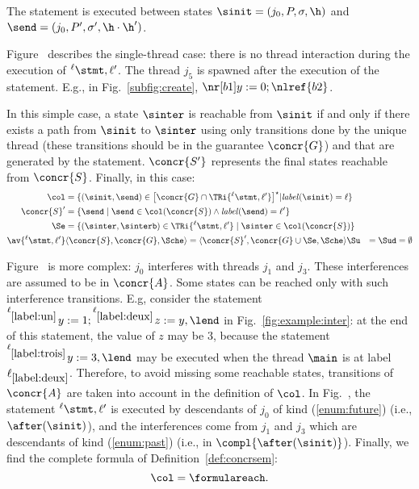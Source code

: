 \documentclass[12pt]{article}
\let\vide\emptyset \let\appartient\in
\let\firstunion\cup
\let\firstinter\cap
\let\emptyset\vide \let\in\appartient
\let\cup\firstunion
\let\cap\firstinter
\newcommand{\lab}{  {}^{\ell}}
\newcommand{\li}[1]{ {}^{\ell_{#1}}  }
\newcommand{\lbl}{\mathit{label}}
\begin{document}
The statement is executed between states \(\sinit=(j_0,P,\m,\h)\) and \(\send=(j_0,P',\m',\h\cdot \h')\).

Figure~ describes the single-thread case: there is no thread interaction during the execution of \(\lab \stmt,\ell'\). The thread \(j_5\) is spawned after the execution of the statement. 
E.g., in Fig.~\ref{subfig:create}, \(\nr[b1] y:=0;\nlref{b2}\).



In this simple case, a state \(\sinter\) is reachable from \(\sinit\) if and only if there exists a path from \(\sinit\) to \(\sinter\) using only transitions done by the unique thread (these transitions should be in the guarantee \(\concr{G}\)) and that are generated by the statement. \(\concr{S'}\) represents the final states reachable from \(\concr{S}\). Finally, in this case:
 \begin{align*}
 \col&=\{(\sinit,\send)\in\big[\concr{G}\cap \TRi{\lab \stmt,\ell'} \big]^{\star}| \lbl(\sinit)=\ell\}\\
 \concr{S}' &= \{\send \mid \send\in\col(\concr{S}) \wedge \lbl(\send)=\ell' \} \\
 \Se&=\{(\sinter,\sinterb)\in \TRi{\lab \stmt,\ell'} \mid \sinter\in \col(\concr{S}) \}\\
 \av{\lab \stmt,\ell'}&\langle \concr{S}, \concr{G} , \Sche \rangle = \langle \concr{S}',
 \concr{G}\cup\Se,
 \Sche   \rangle \vspace{-1.5mm}
 \Su&=\Sud=\emptyset
 \end{align*}


 

Figure~ is more complex: \(j_0\) interferes with threads \(j_1\) and \(j_3\).
These interferences are assumed to be in \(\concr{A}\). Some states can be reached only with such interference transitions. E.g, consider the statement \(\li{_{\ref{label:un}}} y:= 1; \li{_{\ref{label:deux}}} z:=y,\lend\) in Fig.~\ref{fig:example:inter}: 
at the end of this statement, the value of \(z\) may be \(3\), because the statement \(\li{_{\ref{label:trois}}}y:=3,\lend\) may be executed when the thread \(\main\) is at label \(\ell_{\ref{label:deux}}\). 
Therefore, to avoid missing some reachable states, transitions of \(\concr{A}\) are taken into account in the definition of \(\col\).
 In Fig.~, the statement \(\lab \stmt,\ell'\) is executed by descendants of \(j_0\) of kind (\ref{enum:future}) (i.e., \(\after(\sinit)\)), and the interferences come from \(j_1\) and \(j_3\) which are descendants of kind (\ref{enum:past}) (i.e., in \(\compl{\after(\sinit)}\)).
Finally, we find the complete formula of Definition~\ref{def:concrsem}: \[\col = \formulareach. \]
\end{document}
